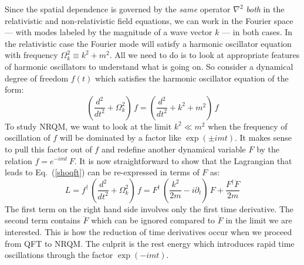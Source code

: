 \documentclass{article}
\def\eq#1{{Eq.~(\ref{#1})}}
\begin{document}
Since the spatial dependence is governed by the \textit{same} operator $\nabla^2$ \textit{both }in the relativistic and non-relativistic field equations, we can work in the Fourier space --- with modes labeled by the magnitude of a wave vector $k$ --- in both cases.  In the relativistic case the Fourier mode will satisfy a harmonic oscillator equation with frequency $\Omega_k^2\equiv k^2+m^2$. All  we need to do is to look at appropriate features of harmonic oscillators to understand what is going on. So consider a dynamical degree of freedom $f(t)$ which satisfies the harmonic oscillator equation of the form:
\begin{equation}
 \left( \frac{d^2}{dt^2} + \Omega_k^2\right)\, f = \left( \frac{d^2}{dt^2} + k^2 + m^2 \right)\, f
 \label{shoqft}
\end{equation} 
 To study NRQM, we want to look at the limit $k^2 \ll m^2$ when the frequency of oscillation of $f$ will be dominated by a factor like $\exp(\pm imt)$. It makes sense to pull this factor out of $f$ and redefine another dynamical variable $F$ by the relation $f= e^{-imt}\, F$.  It is now straightforward to show that the Lagrangian that leads to \eq{shoqft} can be re-expressed in terms of $F$ as:
\begin{equation}
 L= f^\dagger\, \left( \frac{d^2}{dt^2} + \Omega_k^2\right)\, f = F^\dagger\, \left( \frac{k^2}{2m} - i \partial_t\right) \, F + \frac{F^\dagger\ddot F}{2m}
\end{equation} 
The first term on the right hand side involves only the first time derivative. The second term contains $\ddot F$ which can be ignored compared to $\dot F$ in the limit we are interested. This is how the reduction of time derivatives occur when we proceed from QFT to NRQM. The culprit is the rest energy which introduces rapid time oscillations through the factor $\exp(-imt)$. 
\end{document}
